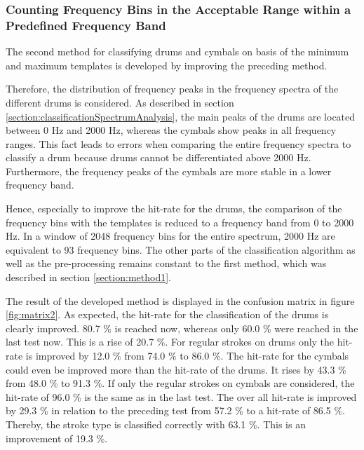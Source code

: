 \subsubsection{Counting Frequency Bins in the Acceptable Range within a Predefined Frequency Band}
\label{section:shapeComparisonClassification2}

The second method for classifying drums and cymbals on basis of the minimum and maximum templates is developed by improving the preceding method.

Therefore, the distribution of frequency peaks in the frequency spectra of the different drums is considered. As described in section \ref{section:classificationSpectrumAnalysis}, the main peaks of the drums are located between 0 Hz and 2000 Hz, whereas the cymbals show peaks in all frequency ranges. This fact leads to errors when comparing the entire frequency spectra to classify a drum because drums cannot be differentiated above 2000 Hz. Furthermore, the frequency peaks of the cymbals are more stable in a lower frequency band.

Hence, especially to improve the hit-rate for the drums, the comparison of the frequency bins with the templates is reduced to a frequency band from 0 to 2000 Hz. In a window of 2048 frequency bins for the entire spectrum, 2000 Hz are equivalent to 93 frequency bins. The other parts of the classification algorithm as well as  the pre-processing remains constant to the first method, which was described in section \ref{section:method1}. 

The result of the developed method is displayed in the confusion matrix in figure \ref{fig:matrix2}. As expected, the hit-rate for the classification of the drums is clearly improved. 80.7 \% is reached now, whereas only 60.0 \% were reached in the last test now. This is a rise of 20.7 \%. For regular strokes on drums only the hit-rate is improved by 12.0 \% from 74.0 \% to 86.0 \%. The hit-rate for the cymbals could even be improved more than the hit-rate of the drums. It rises by 43.3 \% from 48.0 \% to 91.3 \%. If only the regular strokes on cymbals are considered, the hit-rate  of 96.0 \% is the same as in the last test. The over all hit-rate is improved by 29.3 \% in relation to the preceding test from 57.2 \% to a hit-rate of 86.5 \%. Thereby, the stroke type is classified correctly with 63.1 \%. This is an improvement of 19.3 \%.

